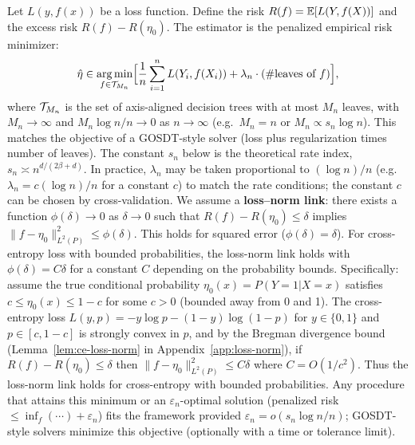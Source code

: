 \documentclass[12pt]{article}
\begin{document}
Let $L(y, f(x))$ be a loss function. Define the risk $R(f) = \mathbb{E}[L(Y, f(X))]$ and the excess risk $R(f) - R(\eta_0)$. The estimator is the penalized empirical risk minimizer:
\begin{equation}
\label{eq:perm}
\hat\eta \in \operatorname*{arg\,min}_{f \in \mathcal{T}_{M_n}} \Bigl[ \frac{1}{n}\sum_{i=1}^n L(Y_i, f(X_i)) + \lambda_n \cdot (\#\text{leaves of } f) \Bigr],
\end{equation}
where $\mathcal{T}_{M_n}$ is the set of axis-aligned decision trees with at most $M_n$ leaves, with $M_n \to \infty$ and $M_n \log n / n \to 0$ as $n \to \infty$ (e.g.\ $M_n = n$ or $M_n \propto s_n \log n$). This matches the objective of a GOSDT-style solver (loss plus regularization times number of leaves). The constant $s_n$ below is the theoretical rate index, $s_n \asymp n^{d/(2\beta+d)}$. In practice, $\lambda_n$ may be taken proportional to $(\log n)/n$ (e.g.\ $\lambda_n = c (\log n)/n$ for a constant $c$) to match the rate conditions; the constant $c$ can be chosen by cross-validation. We assume a \textbf{loss--norm link}: there exists a function $\phi(\delta) \to 0$ as $\delta \to 0$ such that $R(f) - R(\eta_0) \le \delta$ implies $\|f - \eta_0\|_{L^2(P)}^2 \le \phi(\delta)$. This holds for squared error ($\phi(\delta)=\delta$). For cross-entropy loss with bounded probabilities, the loss-norm link holds with $\phi(\delta) = C\delta$ for a constant $C$ depending on the probability bounds. Specifically: assume the true conditional probability $\eta_0(x) = P(Y=1|X=x)$ satisfies $c \le \eta_0(x) \le 1-c$ for some $c > 0$ (bounded away from 0 and 1). The cross-entropy loss $L(y, p) = -y \log p - (1-y) \log(1-p)$ for $y \in \{0,1\}$ and $p \in [c, 1-c]$ is strongly convex in $p$, and by the Bregman divergence bound (Lemma~\ref{lem:ce-loss-norm} in Appendix~\ref{app:loss-norm}), if $R(f) - R(\eta_0) \le \delta$ then $\|f - \eta_0\|_{L^2(P)}^2 \le C\delta$ where $C = O(1/c^2)$. Thus the loss-norm link holds for cross-entropy with bounded probabilities. Any procedure that attains this minimum or an $\varepsilon_n$-optimal solution (penalized risk $\le \inf_f (\cdots) + \varepsilon_n$) fits the framework provided $\varepsilon_n = o(s_n \log n / n)$; GOSDT-style solvers minimize this objective (optionally with a time or tolerance limit).
\end{document}
